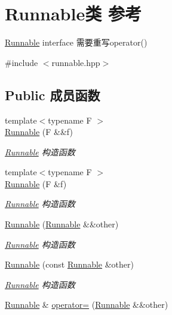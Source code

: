 \hypertarget{classRunnable}{}\section{Runnable类 参考}
\label{classRunnable}


\hyperlink{classRunnable}{Runnable} interface 需要重写operator()  




{\ttfamily \#include $<$runnable.\+hpp$>$}

\subsection*{Public 成员函数}
\begin{DoxyCompactItemize}
\item 
{\footnotesize template$<$typename F $>$ }\\\hyperlink{classRunnable_ab052afa8b53dd1e7c28e978962839446}{Runnable} (F \&\&f)
\begin{DoxyCompactList}\small\item\em \hyperlink{classRunnable}{Runnable} 构造函数 \end{DoxyCompactList}\item 
{\footnotesize template$<$typename F $>$ }\\\hyperlink{classRunnable_aaac34b8a861ab506499f8ec791e7cc16}{Runnable} (F \&f)
\begin{DoxyCompactList}\small\item\em \hyperlink{classRunnable}{Runnable} 构造函数 \end{DoxyCompactList}\item 
\hyperlink{classRunnable_af028c95562f219c2af2439ae69e44755}{Runnable} (\hyperlink{classRunnable}{Runnable} \&\&other)
\begin{DoxyCompactList}\small\item\em \hyperlink{classRunnable}{Runnable} 构造函数 \end{DoxyCompactList}\item 
\hyperlink{classRunnable_a316ac005c1584a21b458fc673c04aed8}{Runnable} (const \hyperlink{classRunnable}{Runnable} \&other)
\begin{DoxyCompactList}\small\item\em \hyperlink{classRunnable}{Runnable} 构造函数 \end{DoxyCompactList}\item 
\hyperlink{classRunnable}{Runnable} \& \hyperlink{classRunnable_a3ee19e0ee460449458ca79274908aef3}{operator=} (\hyperlink{classRunnable}{Runnable} \&\&other)

\end{DoxyCompactItemize}
